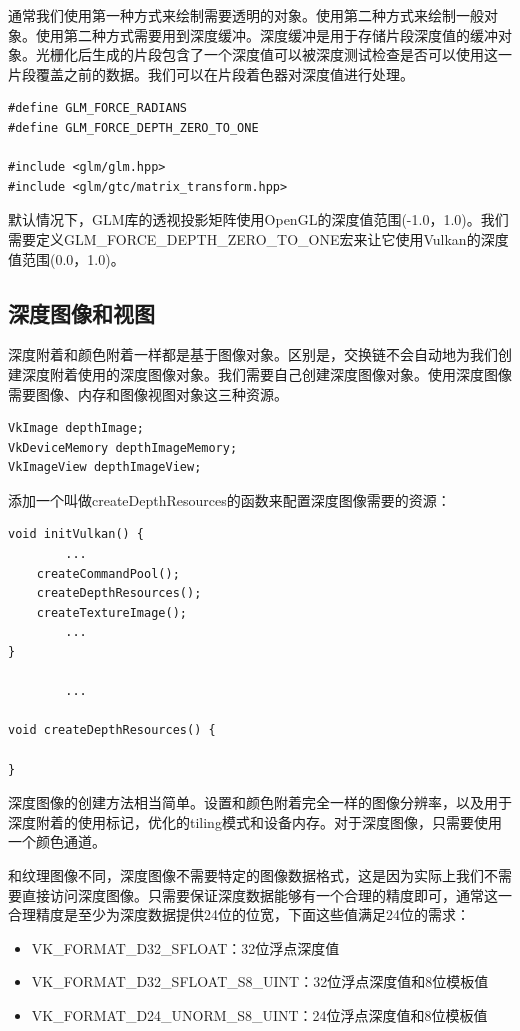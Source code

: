 \documentclass{ctexart}
\begin{document}
通常我们使用第一种方式来绘制需要透明的对象。使用第二种方式来绘制一般对象。使用第二种方式需要用到深度缓冲。深度缓冲是用于存储片段深度值的缓冲对象。光栅化后生成的片段包含了一个深度值可以被深度测试检查是否可以使用这一片段覆盖之前的数据。我们可以在片段着色器对深度值进行处理。

\begin{lstlisting}[language={[ANSI]C}]
#define GLM_FORCE_RADIANS
#define GLM_FORCE_DEPTH_ZERO_TO_ONE

#include <glm/glm.hpp>
#include <glm/gtc/matrix_transform.hpp>
\end{lstlisting}

默认情况下，GLM库的透视投影矩阵使用OpenGL的深度值范围(-1.0，1.0)。我们需要定义GLM\_FORCE\_DEPTH\_ZERO\_TO\_ONE宏来让它使用Vulkan的深度值范围(0.0，1.0)。

\subsection{深度图像和视图}

深度附着和颜色附着一样都是基于图像对象。区别是，交换链不会自动地为我们创建深度附着使用的深度图像对象。我们需要自己创建深度图像对象。使用深度图像需要图像、内存和图像视图对象这三种资源。

\begin{lstlisting}[language={[ANSI]C}]
VkImage depthImage;
VkDeviceMemory depthImageMemory;
VkImageView depthImageView;
\end{lstlisting}

添加一个叫做createDepthResources的函数来配置深度图像需要的资源：

\begin{lstlisting}[language={[ANSI]C}]
void initVulkan() {
		...
	createCommandPool();
	createDepthResources();
	createTextureImage();
		...
}

		...

void createDepthResources() {

}
\end{lstlisting}

深度图像的创建方法相当简单。设置和颜色附着完全一样的图像分辨率，以及用于深度附着的使用标记，优化的tiling模式和设备内存。对于深度图像，只需要使用一个颜色通道。

和纹理图像不同，深度图像不需要特定的图像数据格式，这是因为实际上我们不需要直接访问深度图像。只需要保证深度数据能够有一个合理的精度即可，通常这一合理精度是至少为深度数据提供24位的位宽，下面这些值满足24位的需求：

\begin{itemize}
	\item VK\_FORMAT\_D32\_SFLOAT：32位浮点深度值
	\item VK\_FORMAT\_D32\_SFLOAT\_S8\_UINT：32位浮点深度值和8位模板值
	\item VK\_FORMAT\_D24\_UNORM\_S8\_UINT：24位浮点深度值和8位模板值
\end{itemize}
\end{document}
